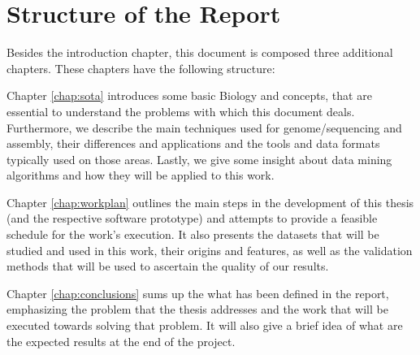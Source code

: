 \section{Structure of the Report} \label{sec:outline}

Besides the introduction chapter, this document is composed three additional
chapters. These chapters have the following structure:

Chapter \ref{chap:sota} introduces some basic Biology and \rnaseq{} concepts,
that are essential to understand the problems with which this document deals.
Furthermore, we describe the main techniques used for genome/\trans sequencing
and assembly, their differences and applications and the tools and data formats
typically used on those areas. Lastly, we give some insight about data mining
algorithms and how they will be applied to this work.

Chapter \ref{chap:workplan} outlines the main steps in the development of this
thesis (and the respective software prototype) and attempts to provide a
feasible schedule for the work's execution. It also presents the datasets that
will be studied and used in this work, their origins and features, as well as
the validation methods that will be used to ascertain the quality of our
results.

Chapter \ref{chap:conclusions} sums up the what has been defined in the report,
emphasizing the problem that the thesis addresses and the work that will be
executed towards solving that problem. It will also give a brief idea of what
are the expected results at the end of the project.

